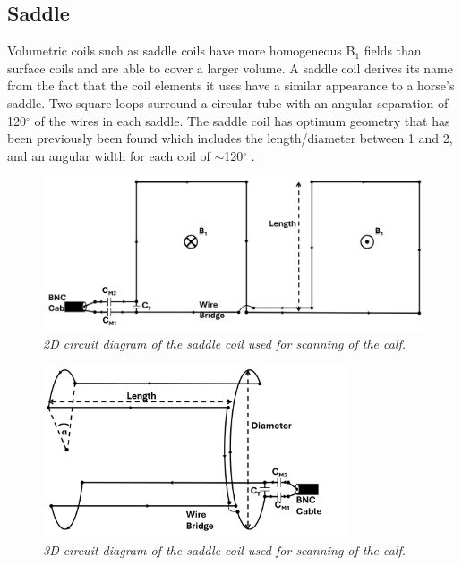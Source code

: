 \subsection{Saddle}

Volumetric coils such as saddle coils have more homogeneous B$_1$ fields than surface coils and are able to cover a larger volume. A saddle coil derives its name from the fact that the coil elements it uses have a similar appearance to a horse's saddle. Two square loops surround a circular tube with an angular separation of 120$^\circ$ of the wires in each saddle. The saddle coil has optimum geometry that has been previously been found which includes the length/diameter between 1 and 2, and an angular width for each coil of $\sim$120$^\circ$ \cite{Ginsberg1970OptimumField,Salmon2006OptimizationImaging}.

\begin{figure}[H]
    \centering
    \includegraphics[width=1\textwidth]{Figures/Coils/Planar_Saddle.png}
    \caption{\textit{2D circuit diagram of the saddle coil used for scanning of the calf.}}
    \label{fig:coils:2D_Saddle}
\end{figure}

\begin{figure}[H]
    \centering
    \includegraphics[width=0.8\textwidth]{Figures/Coils/3D_Saddle.png}
    \caption{\textit{3D circuit diagram of the saddle coil used for scanning of the calf.}}
    \label{fig:coils:3D_Saddle}
\end{figure}

